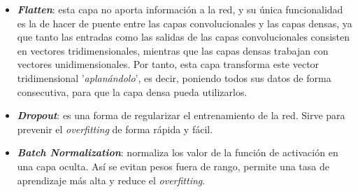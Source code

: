 \documentclass{uc3mpracticas}
\begin{document}
  \begin{itemize}
    \item \textbf{\textit{Flatten}}: esta capa no aporta información a la red, y su única funcionalidad es la de hacer de puente entre las capas convolucionales y las capas densas, ya que tanto las entradas como las salidas de las capas convolucionales consisten en vectores tridimensionales, mientras que las capas densas trabajan con vectores unidimensionales. Por tanto, esta capa transforma este vector tridimensional '\textit{aplanándolo}', es decir, poniendo todos sus datos de forma consecutiva, para que la capa densa pueda utilizarlos.

    \item \textbf{\textit{Dropout}}: es una forma de regularizar el entrenamiento de la red. Sirve para prevenir el \textit{overfitting} de forma rápida y fácil.

    \item \textbf{\textit{Batch Normalization}}: normaliza los valor de la función de activación en una capa oculta. Así se evitan pesos fuera de rango, permite una tasa de aprendizaje más alta y reduce el \textit{overfitting}.

  \end{itemize}

  \newpage
\end{document}
